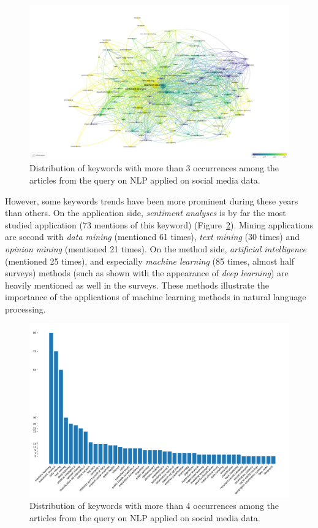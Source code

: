 \begin{landscape}
    \begin{figure}[hp]
        \includegraphics[width=\paperwidth,height=\paperheight,keepaspectratio]{figures/chap-2/nlp-overlay.pdf}
        \caption{Distribution of keywords with more than 3 occurrences among the articles from the query on NLP applied on social media data.}
        \label{literature:nlp-overlay}
    \end{figure}
\end{landscape}

However, some keywords trends have been more prominent during these years than others.
On the application side, \emph{sentiment analyses} is by far the most studied application (73 mentions of this keyword) (Figure~\ref{literature:nlp-bar}).
Mining applications are second with \emph{data mining} (mentioned 61 times), \emph{text mining} (30 times) and \emph{opinion mining} (mentioned 21 times).
On the method side, \emph{artificial intelligence} (mentioned 25 times), and especially \emph{machine learning} (85 times, almost half surveys) methods (such as shown with the appearance of \emph{deep learning}) are heavily mentioned as well in the surveys.
These methods illustrate the importance of the applications of machine learning methods in natural language processing.

\begin{figure}[thb]
    \centering
    \includegraphics[width=\textwidth]{figures/chap-2/nlp-bar.pdf}
    \caption{Distribution of keywords with more than 4 occurrences among the articles from the query on NLP applied on social media data.}
    \label{literature:nlp-bar}
\end{figure}

